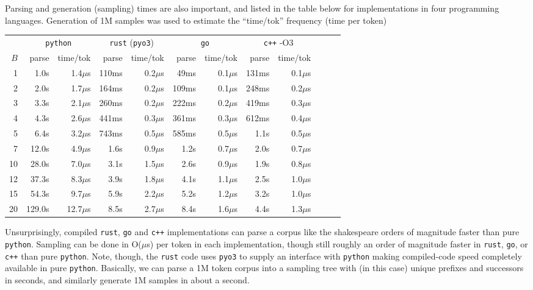 \documentclass[11pt, oneside]{amsart}   	%
\begin{document}
Parsing and generation (sampling) times are also important, and listed in the table below for implementations in four programming languages. Generation of 1M samples was used to estimate the ``time/tok'' frequency (time per token) 
\begin{center}
\begin{small}
\begin{tabular}{ r r r r r r r r r r r r}
  & \multicolumn{2}{c}{\texttt{python}} 
  	& \multicolumn{2}{c}{\texttt{rust} (\texttt{pyo3})} 
  	& \multicolumn{2}{c}{\texttt{go}} 
	& \multicolumn{2}{c}{\texttt{c++} -O3} \\
 $B$ & parse & time/tok & parse & time/tok & parse & time/tok & parse & time/tok \\ \hline
 1 & 1.0s & 1.4$\mu$s & 110ms & 0.2$\mu$s & 49ms & 0.1$\mu$s & 131ms & 0.1$\mu$s \\  
 2 & 2.0s & 1.7$\mu$s & 164ms & 0.2$\mu$s & 109ms & 0.1$\mu$s & 248ms & 0.2$\mu$s \\  
 3 & 3.3s & 2.1$\mu$s & 260ms & 0.2$\mu$s & 222ms & 0.2$\mu$s & 419ms & 0.3$\mu$s \\
 4 & 4.3s & 2.6$\mu$s & 441ms & 0.3$\mu$s & 361ms & 0.3$\mu$s & 612ms & 0.4$\mu$s \\
 5 & 6.4s & 3.2$\mu$s & 743ms & 0.5$\mu$s & 585ms & 0.5$\mu$s & 1.1s & 0.5$\mu$s \\
 7 & 12.0s & 4.9$\mu$s & 1.6s & 0.9$\mu$s & 1.2s & 0.7$\mu$s & 2.0s & 0.7$\mu$s \\
 10 & 28.0s & 7.0$\mu$s & 3.1s & 1.5$\mu$s & 2.6s & 0.9$\mu$s & 1.9s & 0.8$\mu$s \\  
 12 & 37.3s & 8.3$\mu$s & 3.9s & 1.8$\mu$s & 4.1s & 1.1$\mu$s & 2.5s & 1.0$\mu$s \\
 15 & 54.3s & 9.7$\mu$s & 5.9s & 2.2$\mu$s & 5.2s & 1.2$\mu$s & 3.2s & 1.0$\mu$s \\  
 20 & 129.0s & 12.7$\mu$s & 8.5s & 2.7$\mu$s & 8.4s & 1.6$\mu$s & 4.4s & 1.3$\mu$s \\  \hline
\end{tabular}
\end{small}
\end{center}
Unsurprisingly, compiled \texttt{rust}, \texttt{go} and \texttt{c++} implementations can parse a corpus like the shakespeare orders of magnitude faster than pure \texttt{python}. Sampling can be done in O($\mu$s) per token in each implementation, though still roughly an order of magnitude faster in \texttt{rust}, \texttt{go}, or \texttt{c++} than pure \texttt{python}. Note, though, the \texttt{rust} code uses \texttt{pyo3} to supply an interface with \texttt{python} making compiled-code speed completely available in pure \texttt{python}. Basically, we can parse a 1M token corpus into a sampling tree with (in this case) unique prefixes and successors in seconds, and similarly generate 1M samples in about a second. 
\end{document}
